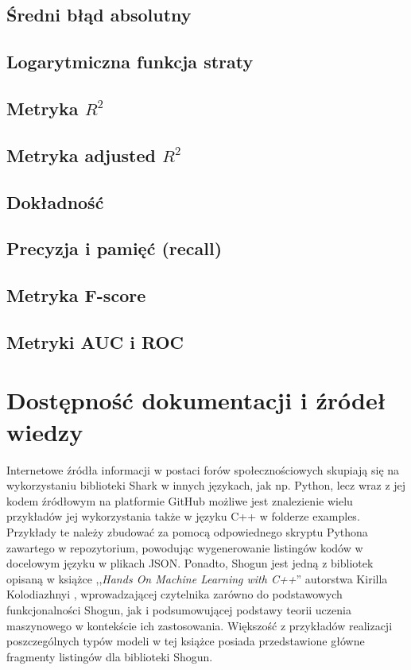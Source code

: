 
\subsection{Średni błąd absolutny}

\subsection{Logarytmiczna funkcja straty}
\subsection{Metryka $R^2$}
\subsection{Metryka adjusted $R^2$}
\subsection{Dokładność}
\subsection{Precyzja i pamięć (recall)}
\subsection{Metryka F-score}
\subsection{Metryki AUC i ROC}

\section{Dostępność dokumentacji i źródeł wiedzy}

Internetowe źródła informacji w postaci forów społecznościowych skupiają się na wykorzystaniu biblioteki Shark w innych językach, jak np. Python, lecz wraz z jej kodem źródłowym na platformie GitHub \cite{shogun:github} możliwe jest znalezienie wielu przykładów jej wykorzystania także w języku C++ w folderze examples. Przykłady te należy zbudować za pomocą odpowiednego skryptu Pythona zawartego w repozytorium, powodując wygenerowanie listingów kodów w docelowym języku w plikach JSON. Ponadto, Shogun jest jedną z bibliotek opisaną w książce ,,\textit{Hands On Machine Learning with C++}'' autorstwa Kirilla Kolodiazhnyi \cite{handsOnMachineLearning}, wprowadzającej czytelnika zarówno do podstawowych funkcjonalności Shogun, jak i podsumowującej podstawy teorii uczenia maszynowego w kontekście ich zastosowania. Większość z przykładów realizacji poszczególnych typów modeli w tej książce posiada przedstawione główne fragmenty listingów dla biblioteki Shogun.

